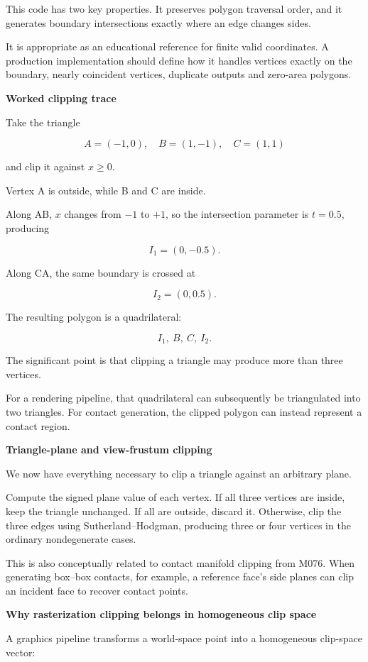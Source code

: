 This code has two key properties. It preserves polygon traversal order, and it generates boundary intersections exactly where an edge changes sides.

It is appropriate as an educational reference for finite valid coordinates. A production implementation should define how it handles vertices exactly on the boundary, nearly coincident vertices, duplicate outputs and zero-area polygons.

\textbf{Worked clipping trace}

Take the triangle

\[
A=(-1,0),\quad B=(1,-1),\quad C=(1,1)
\]

and clip it against \(x\ge0\).

Vertex A is outside, while B and C are inside.

Along AB, \(x\) changes from \(-1\) to \(+1\), so the intersection parameter is \(t=0.5\), producing

\[
I_1=(0,-0.5).
\]

Along CA, the same boundary is crossed at

\[
I_2=(0,0.5).
\]

The resulting polygon is a quadrilateral:

\[
I_1,\ B,\ C,\ I_2.
\]

The significant point is that clipping a triangle may produce more than three vertices.

For a rendering pipeline, that quadrilateral can subsequently be triangulated into two triangles. For contact generation, the clipped polygon can instead represent a contact region.

\textbf{Triangle-plane and view-frustum clipping}

We now have everything necessary to clip a triangle against an arbitrary plane.

Compute the signed plane value of each vertex. If all three vertices are inside, keep the triangle unchanged. If all are outside, discard it. Otherwise, clip the three edges using Sutherland--Hodgman, producing three or four vertices in the ordinary nondegenerate cases.

This is also conceptually related to contact manifold clipping from M076. When generating box--box contacts, for example, a reference face's side planes can clip an incident face to recover contact points.

\textbf{Why rasterization clipping belongs in homogeneous clip space}

A graphics pipeline transforms a world-space point into a homogeneous clip-space vector:

